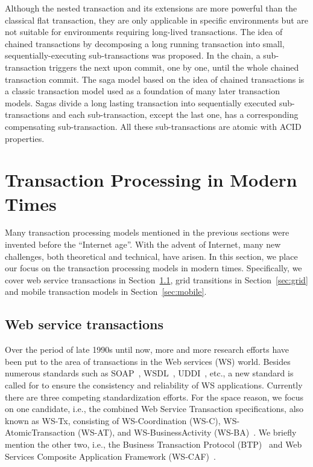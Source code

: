 \documentclass{sig-alternate-05-2015}
\begin{document}
Although the nested transaction and its extensions are more powerful than the classical flat transaction, they are only applicable in specific environments but are not suitable for environments requiring long-lived transactions. The idea of chained transactions by decomposing a long running transaction into small, sequentially-executing sub-transactions was proposed. In the chain, a sub-transaction triggers the next upon commit, one by one, until the whole chained transaction commit. The saga model \cite{garcia1987sagas} based on the idea of chained transactions is a classic transaction model used as a foundation of many later transaction models. Sagas divide a long lasting transaction into sequentially executed sub-transactions and each sub-transaction, except the last one, has a corresponding compensating sub-transaction. All these sub-transactions are atomic with ACID properties.


\section{Transaction Processing in Modern Times}
\label{sec:modern}

Many transaction processing models mentioned in the previous sections
were invented before the ``Internet age''. With the advent of
Internet, many new challenges, both theoretical and technical, have
arisen. In this section, we place our focus on the transaction
processing models in modern times. Specifically, we cover web service
transactions in Section~\ref{sec:web}, grid transitions in
Section~\ref{sec:grid} and mobile transaction models in
Section~\ref{sec:mobile}.

\subsection{Web service transactions}
\label{sec:web}

Over the period of late 1990s until now, more and more research
efforts have been put to the area of transactions in the Web services
(WS) world. Besides numerous standards such as SOAP~\cite{soap},
WSDL~\cite{wsdl}, UDDI~\cite{uddi}, etc., a new standard is called for
to ensure the consistency and reliability of WS
applications. Currently there are three competing standardization
efforts. For the space reason, we focus on one candidate, i.e., the
combined Web Service Transaction specifications, also known as WS-Tx,
consisting of WS-Coordination (WS-C), WS-AtomicTransaction (WS-AT),
and WS-BusinessActivity (WS-BA)~\cite{wsc, wsat, wsba}. We briefly
mention the other two, i.e., the Business Transaction Protocol
(BTP)~\cite{btp} and Web Services Composite Application Framework
(WS-CAF)~\cite{wscaf}.
\end{document}
